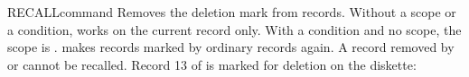 \begin{XbaseEntry}{RECALL}{command}
Removes the deletion mark from records.
\Syntax
{}
\Defaults
Without a scope or a condition,  works on the current record
only.  With a  condition and no scope, the scope is .
\Usage
{} makes records marked by  ordinary records again.  A
record removed by  or  cannot be recalled.
\Examples
Record 13 of  is marked for deletion on the diskette:
\end{XbaseEntry}

